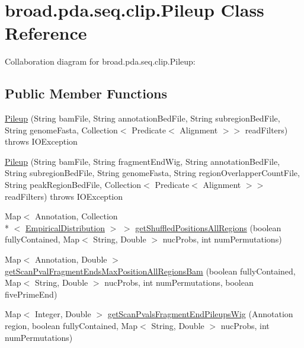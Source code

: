 \hypertarget{classbroad_1_1pda_1_1seq_1_1clip_1_1_pileup}{\section{broad.\+pda.\+seq.\+clip.\+Pileup Class Reference}
\label{classbroad_1_1pda_1_1seq_1_1clip_1_1_pileup}
}


Collaboration diagram for broad.\+pda.\+seq.\+clip.\+Pileup\+:
\subsection*{Public Member Functions}
\begin{DoxyCompactItemize}
\item 
\hyperlink{classbroad_1_1pda_1_1seq_1_1clip_1_1_pileup_a21189ad218d6b720b568c74b4270884d}{Pileup} (String bam\+File, String annotation\+Bed\+File, String subregion\+Bed\+File, String genome\+Fasta, Collection$<$ Predicate$<$ Alignment $>$$>$ read\+Filters)  throws I\+O\+Exception 
\item 
\hyperlink{classbroad_1_1pda_1_1seq_1_1clip_1_1_pileup_af08c5950bd4da328783f0d86f773b847}{Pileup} (String bam\+File, String fragment\+End\+Wig, String annotation\+Bed\+File, String subregion\+Bed\+File, String genome\+Fasta, String region\+Overlapper\+Count\+File, String peak\+Region\+Bed\+File, Collection$<$ Predicate$<$ Alignment $>$$>$ read\+Filters)  throws I\+O\+Exception 
\item 
Map$<$ Annotation, Collection\\*
$<$ \hyperlink{classbroad_1_1core_1_1math_1_1_empirical_distribution}{Empirical\+Distribution} $>$ $>$ \hyperlink{classbroad_1_1pda_1_1seq_1_1clip_1_1_pileup_a3192137e746edd357a296f5d823f8e2f}{get\+Shuffled\+Positions\+All\+Regions} (boolean fully\+Contained, Map$<$ String, Double $>$ nuc\+Probs, int num\+Permutations)
\item 
Map$<$ Annotation, Double $>$ \hyperlink{classbroad_1_1pda_1_1seq_1_1clip_1_1_pileup_a75369d564eda2373e41b0fd60451fda8}{get\+Scan\+Pval\+Fragment\+Ends\+Max\+Position\+All\+Regions\+Bam} (boolean fully\+Contained, Map$<$ String, Double $>$ nuc\+Probs, int num\+Permutations, boolean five\+Prime\+End)
\item 
Map$<$ Integer, Double $>$ \hyperlink{classbroad_1_1pda_1_1seq_1_1clip_1_1_pileup_a2f2ec59cc7fdb4ced9c11014070fa10a}{get\+Scan\+Pvals\+Fragment\+End\+Pileups\+Wig} (Annotation region, boolean fully\+Contained, Map$<$ String, Double $>$ nuc\+Probs, int num\+Permutations)

\end{DoxyCompactItemize}
